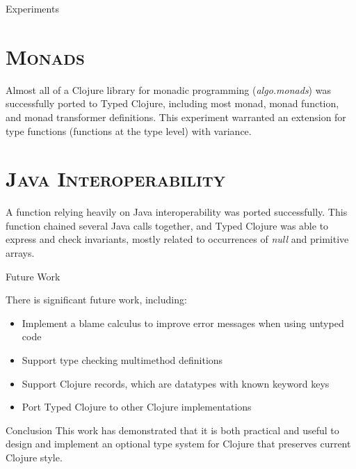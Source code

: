\documentclass[landscape,final,a0paper,fontscale=0.277]{baposter}
\begin{document}
\begin{poster}
\begin{posterbox}[name=experiments,column=2,below=source]{Experiments}

\section*{\textsc{Monads}}

Almost all of a Clojure library for monadic programming (\emph{algo.monads}) was successfully ported
to Typed Clojure, including most monad, monad function, and monad transformer definitions.
This experiment warranted an extension for type functions (functions at the type level) with variance.

\section*{\textsc{Java Interoperability}}

A function relying heavily on Java interoperability was ported successfully.
This function chained several Java calls together, and
Typed Clojure was able to express and check invariants, mostly related to occurrences of \emph{null}
and primitive arrays.

\end{posterbox}

\begin{posterbox}[name=futurework,column=2,below=experiments]{Future Work}

There is significant future work, including:

\begin{itemize}
\item Implement a blame calculus to improve error messages when using untyped code
\item Support type checking multimethod definitions
\item Support Clojure records, which are datatypes with known keyword keys
\item Port Typed Clojure to other Clojure implementations
\end{itemize}

\end{posterbox}

\begin{posterbox}[name=conclusion,column=2,below=futurework]{Conclusion}
This work has demonstrated that it is both practical and useful to
design and implement an optional type system for Clojure that preserves
current Clojure style.
\end{posterbox}


\end{poster}
\end{document}
